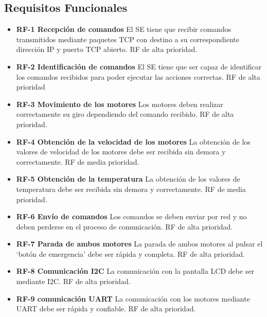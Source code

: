 \subsection{Requisitos Funcionales}
\begin{itemize}
  	\item \textbf{RF-1 Recepción de comandos} El SE tiene que recibir comandos transmitidos mediante paquetes TCP con destino a su correspondiente dirección IP y puerto TCP abierto. RF de alta prioridad.
  	\item \textbf{RF-2 Identificación de comandos} El SE tiene que ser capaz de identificar los comandos recibidos para poder ejecutar las acciones correctas. RF de alta prioridad
  	\item \textbf{RF-3 Movimiento de los motores} Los motores deben realizar correctamente su giro dependiendo del comando recibido. RF de alta prioridad.
  	\item \textbf{RF-4 Obtención de la velocidad de los motores} La obtención de los valores de velocidad de los motores debe ser recibida sin demora y correctamente. RF de media prioridad.
  	\item \textbf{RF-5 Obtención de la temperatura} La obtención de los valores de temperatura debe ser recibida sin demora y correctamente. RF de media prioridad.
  	\item \textbf{RF-6 Envío de comandos} Los comandos se deben enviar por red y no deben perderse en el proceso de comunicación. RF de alta prioridad.
  	\item \textbf{RF-7 Parada de ambos motores} La parada de ambos motores al pulsar el `botón de emergencia' debe ser rápida y completa. RF de alta prioridad.
  	\item \textbf{RF-8 Comunicación I2C} La comunicación con la pantalla LCD debe ser mediante I2C. RF de alta prioridad.
	\item \textbf{RF-9 comunicación UART} La comunicación con los motores mediante UART debe ser rápida y confiable. RF de alta prioridad.
\end{itemize}

